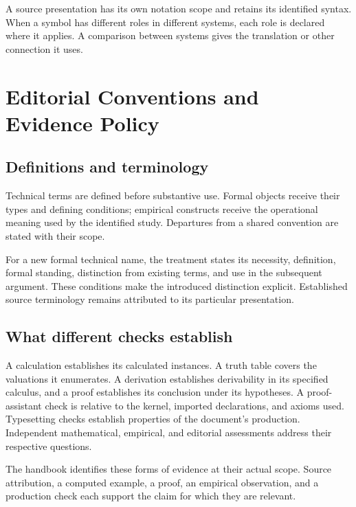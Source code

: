 A source presentation has its own notation scope and retains its
identified syntax. When a symbol has different roles in different
systems, each role is declared where it applies. A comparison between
systems gives the translation or other connection it uses.

\chapter*{Editorial Conventions and Evidence Policy}

\section*{Definitions and terminology}

Technical terms are defined before substantive use. Formal objects
receive their types and defining conditions; empirical constructs receive
the operational meaning used by the identified study.
Departures from a shared convention are stated with their scope.

For a new formal technical name, the treatment states its necessity,
definition, formal standing, distinction from existing terms, and use
in the subsequent argument. These conditions make the introduced
distinction explicit. Established source terminology remains attributed
to its particular presentation.

\section*{What different checks establish}

A calculation establishes its calculated instances. A truth table covers
the valuations it enumerates. A derivation establishes derivability in
its specified calculus, and a proof establishes its conclusion under its
hypotheses. A proof-assistant check is relative to the kernel, imported
declarations, and axioms used. Typesetting checks establish properties of
the document's production. Independent mathematical, empirical, and
editorial assessments address their respective questions.

The handbook identifies these forms of evidence at their actual scope.
Source attribution, a computed example, a proof, an empirical observation,
and a production check each support the claim for which they are relevant.
